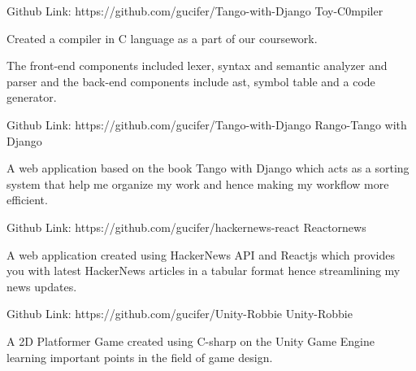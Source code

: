 

\begin{cventries}
  \cventry
    {Github Link: https://github.com/gucifer/Tango-with-Django} %
    {Toy-C0mpiler} %
    {} %
    {} %
    {
      \begin{cvitems} %
        \item {Created a compiler in C language as a part of our coursework.}
        \item {The front-end components included lexer, syntax and semantic analyzer and parser and the back-end components include ast, symbol table and a code generator.}
      \end{cvitems}
    }

  \cventry
    {Github Link: https://github.com/gucifer/Tango-with-Django} %
    {Rango-Tango with Django} %
    {} %
    {} %
    {
      \begin{cvitems} %
        \item {A web application based on the book Tango with Django which acts as a sorting system that help me organize my work and hence making my workflow more efficient.}
      \end{cvitems}
    }
  \cventry
    {Github Link: https://github.com/gucifer/hackernews-react} %
    {Reactornews} %
    {} %
    {} %
    {
      \begin{cvitems} %
        \item {A web application created using HackerNews API and Reactjs which provides you with latest HackerNews articles in a tabular format hence streamlining my news updates.}
      \end{cvitems}
    }
  \cventry
    {Github Link: https://github.com/gucifer/Unity-Robbie} %
    {Unity-Robbie} %
    {} %
    {} %
    {
      \begin{cvitems} %
        \item {A 2D Platformer Game created using C-sharp on the Unity Game Engine learning important points in the field of game design.}
      \end{cvitems}
    }


\end{cventries}
